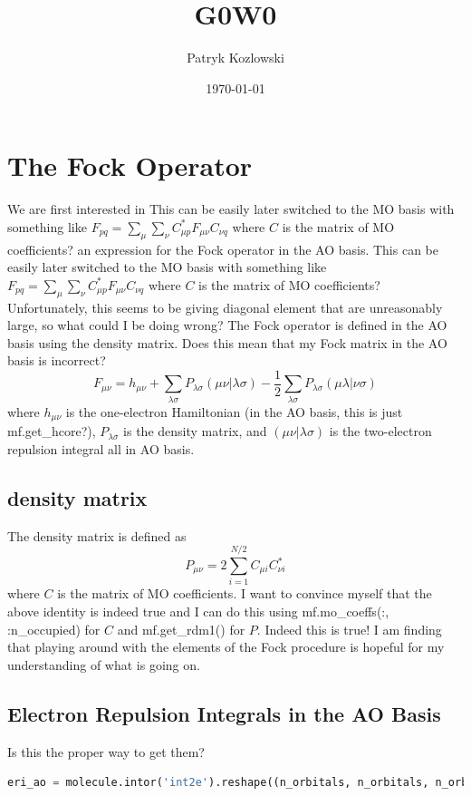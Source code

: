\documentclass[12pt]{article}
\author{Patryk Kozlowski}
\title{G0W0}
\date{\today}
\begin{document}
\maketitle
\section{The Fock Operator}
We are first interested in This can be easily later switched to the MO basis with something like $F_{pq} = \sum_{\mu} \sum_{\nu} C_{\mu p}^{*}F_{\mu\nu}C_{\nu q}$ where $C$ is the matrix of MO coefficients? an expression for the Fock operator in the AO basis. This can be easily later switched to the MO basis with something like $F_{pq} = \sum_{\mu} \sum_{\nu} C_{\mu p}^{*}F_{\mu\nu}C_{\nu q}$ where $C$ is the matrix of MO coefficients? Unfortunately, this seems to be giving diagonal element that are unreasonably large, so what could I be doing wrong? 
The Fock operator is defined in the AO basis using the density matrix. Does this mean that my Fock matrix in the AO basis is incorrect? 
\begin{equation}
F_{\mu\nu} = h_{\mu\nu} + \sum_{\lambda\sigma}P_{\lambda\sigma}(\mu\nu|\lambda\sigma) - \frac{1}{2}\sum_{\lambda\sigma}P_{\lambda\sigma}(\mu\lambda|\nu\sigma)
\end{equation}
where $h_{\mu\nu}$ is the one-electron Hamiltonian (in the AO basis, this is just mf.get\_hcore?), $P_{\lambda\sigma}$ is the density matrix, and $(\mu\nu|\lambda\sigma)$ is the two-electron repulsion integral all in AO basis.
\subsection{density matrix}
The density matrix is defined as
\begin{equation}
P_{\mu\nu} = 2\sum_{i=1}^{N/2}C_{\mu i}C_{\nu i}^{*}
\end{equation}
where $C$ is the matrix of MO coefficients. I want to convince myself that the above identity is indeed true and I can do this using mf.mo\_coeffs(:, :n\_occupied) for $C$ and mf.get\_rdm1() for $P$. Indeed this is true! I am finding that playing around with the elements of the Fock procedure is hopeful for my understanding of what is going on.
\subsection{Electron Repulsion Integrals in the AO Basis}
Is this the proper way to get them?
\begin{lstlisting}[language=Python]
eri_ao = molecule.intor('int2e').reshape((n_orbitals, n_orbitals, n_orbitals, n_orbitals))
\end{lstlisting}
\end{document}
